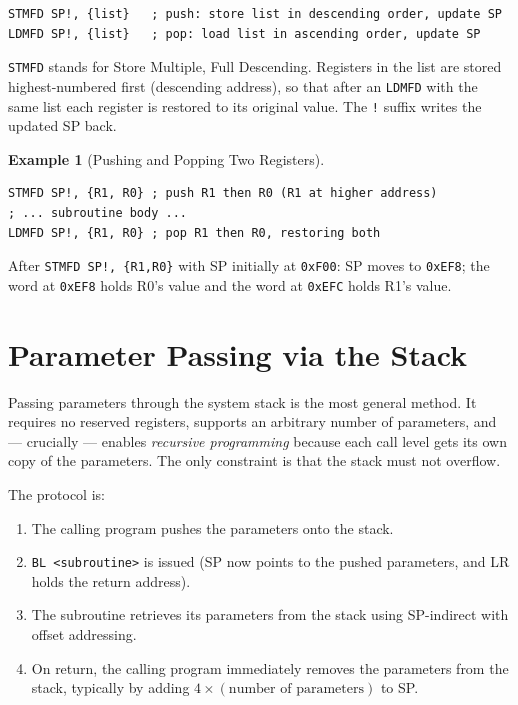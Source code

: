 \documentclass[11pt, a4paper, notitlepage]{report}
\theoremstyle{definition}
\theoremstyle{remark}
\theoremstyle{definition}
\newtheorem{example}[theorem]{Example}
\begin{document}
\begin{lstlisting}
STMFD SP!, {list}   ; push: store list in descending order, update SP
LDMFD SP!, {list}   ; pop: load list in ascending order, update SP
\end{lstlisting}

\texttt{STMFD} stands for Store Multiple, Full Descending. Registers in the list are stored highest-numbered first (descending address), so that after an \texttt{LDMFD} with the same list each register is restored to its original value. The \texttt{!} suffix writes the updated SP back.

\begin{example}[Pushing and Popping Two Registers]
\leavevmode
\begin{lstlisting}
STMFD SP!, {R1, R0} ; push R1 then R0 (R1 at higher address)
; ... subroutine body ...
LDMFD SP!, {R1, R0} ; pop R1 then R0, restoring both
\end{lstlisting}
After \texttt{STMFD SP!, \{R1,R0\}} with SP initially at \texttt{0xF00}: SP moves to \texttt{0xEF8}; the word at \texttt{0xEF8} holds R0's value and the word at \texttt{0xEFC} holds R1's value.
\end{example}

\section{Parameter Passing via the Stack}

Passing parameters through the system stack is the most general method. It requires no reserved registers, supports an arbitrary number of parameters, and --- crucially --- enables \emph{recursive programming} because each call level gets its own copy of the parameters. The only constraint is that the stack must not overflow.

The protocol is:

\begin{enumerate}
  \item The calling program pushes the parameters onto the stack.
  \item \texttt{BL <subroutine>} is issued (SP now points to the pushed parameters, and LR holds the return address).
  \item The subroutine retrieves its parameters from the stack using SP-indirect with offset addressing.
  \item On return, the calling program immediately removes the parameters from the stack, typically by adding $4 \times (\text{number of parameters})$ to SP\@.
\end{enumerate}
\end{document}
